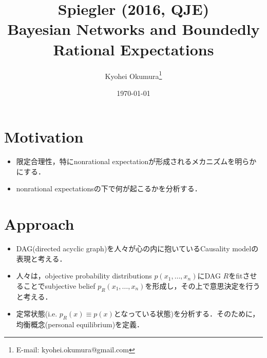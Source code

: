 \documentclass[11pt,a4paper,dvipdfmx]{article}
\theoremstyle{plain}
\begin{document}
\title{Spiegler (2016, QJE) \\
Bayesian Networks and Boundedly Rational Expectations
}
\author{Kyohei Okumura{\footnote{E-mail: kyohei.okumura@gmail.com}
}}
\date{\today}
\maketitle

\section{Motivation}
\begin{itemize}
	\item 限定合理性，特にnonrational expectationが形成されるメカニズムを明らかにする．
	\item nonrational expectationsの下で何が起こるかを分析する．
\end{itemize}

\section{Approach}
\begin{itemize}
	\item DAG(directed acyclic graph)を人々が心の内に抱いているCausality modelの表現と考える．
	\item 人々は，objective probability distributions $p(x_1, \dots, x_n)$にDAG $R$をfitさせることでsubjective belief $p_R(x_1, \dots, x_n)$を形成し，その上で意思決定を行う　と考える．
	\item 定常状態(i.e. $p_R(x) \equiv p(x)$となっている状態)を分析する．そのために，均衡概念(personal equilibrium)を定義．
\end{itemize}
\end{document}
